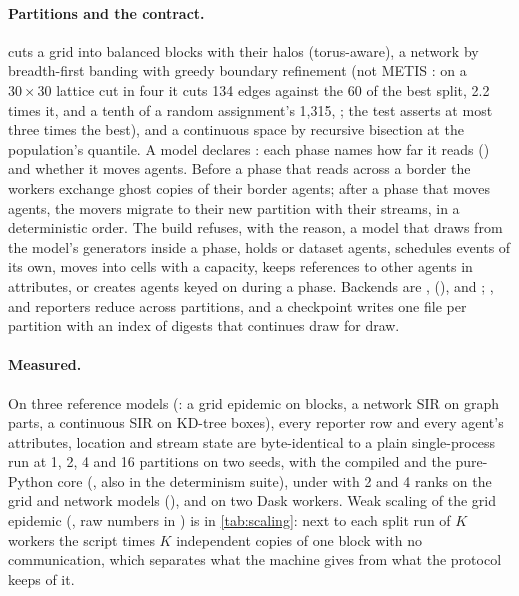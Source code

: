 \paragraph{Partitions and the contract.}  cuts a grid into balanced
blocks with their halos (torus-aware), a network by breadth-first banding with greedy boundary
refinement (not METIS \citep{karypis1998fast}: on a $30 \times 30$ lattice cut in four it cuts 134
edges against the 60 of the best split, 2.2 times it, and a tenth of a random assignment's
1,315, ; the test asserts at most three times the best), and
a continuous space by recursive bisection at the population's quantile. A model declares :
each phase names how far it reads () and whether it moves agents. Before a phase
that reads across a border the workers exchange ghost copies of their border agents; after a
phase that moves agents, the movers migrate to their new partition with their streams, in a
deterministic order. The build refuses, with the reason, a model that draws from the model's
generators inside a phase, holds  or dataset agents, schedules events of its own,
moves into cells with a capacity, keeps references to other agents in attributes, or creates
agents keyed on  during a phase. Backends are , 
(),  and ; ,  and  reporters
reduce across partitions, and a checkpoint writes one file per partition with an index of
digests that  continues draw for draw.

\paragraph{Measured.} On three reference models (: a grid
epidemic on blocks, a network SIR on graph parts, a continuous SIR on KD-tree boxes), every
reporter row and every agent's attributes, location and stream state are byte-identical to a
plain single-process run at 1, 2, 4 and 16 partitions on two seeds, with the compiled and the
pure-Python core (, also in the determinism
suite), under  with 2 and 4 ranks on the grid and network models
(), and on two Dask workers. Weak scaling of the grid epidemic
(, raw numbers in
) is in \cref{tab:scaling}: next to each split run of $K$
workers the script times $K$ independent copies of one block with no communication, which
separates what the machine gives from what the protocol keeps of it.

